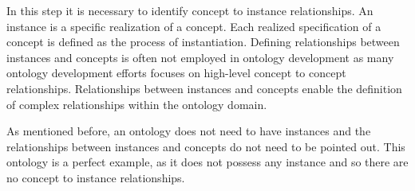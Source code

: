 In this step it is necessary to identify concept to instance relationships. An instance is a specific realization of a concept. Each realized specification of a concept is defined as the process of instantiation. Defining relationships between instances and concepts is often not employed in ontology development as many ontology development efforts focuses on high-level concept to concept relationships. Relationships between instances and concepts enable the definition of complex relationships within the ontology domain. 
    
As mentioned before, an ontology does not need to have instances and the relationships between instances and concepts do not need to be pointed out. This ontology is a perfect example, as it does not possess any instance and so there are no concept to instance relationships. 
